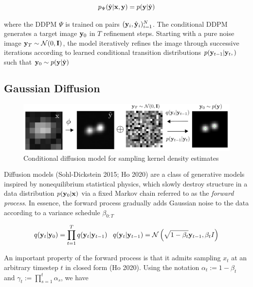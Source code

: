 \documentclass{article}
\begin{document}
\begin{equation*}
p_{\Psi}(\hat{\bold{y}}|\bold{x},\bold{y})=p(\bold{y}|\hat{\bold{y}})
\end{equation*}

where the DDPM $\Psi$ is trained on pairs $(\bold{y}_i,\hat{\bold{y}}_{i})_{i=1}^{N}$. The conditional DDPM generates a target image $\bold{y}_0$ in $T$ refinement steps. Starting with a pure noise image $\bold{y}_{T}\sim \mathcal{N}(0,\bold{I})$, the model iteratively refines the image through successive iterations according to learned conditional transition distributions $p(\bold{y}_{t-1}|\bold{y}_{t},\bold{})$ such that $\bold{y}_{0} \sim p(\bold{y}|\hat{\bold{y}})$ 

\subsection{Gaussian Diffusion}

\begin{figure}
\includegraphics[scale=4.5]{Denoise.png}
\caption{Conditional diffusion model for sampling kernel density estimates}
\end{figure}

Diffusion models (Sohl-Dickstein 2015; Ho 2020) are a class of generative models inspired by nonequilibrium statistical physics, which slowly destroy structure in a data distribution $p(\bold{y}_{0}|\bold{x})$ via a fixed Markov chain referred to as the \emph{forward process}. In essence, the forward process gradually adds Gaussian noise to the data according to a variance schedule $\beta_{0:T}$

\begin{equation}
q(\bold{y}_{t}|\bold{y}_{0}) = \prod_{t=1}^{T}q(\bold{y}_{t}|\bold{y}_{t-1}) \;\;\; q(\bold{y}_{t}|\bold{y}_{t-1}) = \mathcal{N}\left(\sqrt{1-\beta_{t}}\bold{y}_{t-1},\beta_t I\right)
\end{equation}

An important property of the forward process is that it admits sampling $x_t$ at an arbitrary timestep $t$ in closed form (Ho 2020). Using the notation $\alpha_t := 1 - \beta_t$ and $\gamma_t := \prod_{s=1}^{t} \alpha_s$, we have
\end{document}
